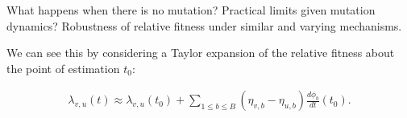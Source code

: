 \documentclass[12pt,oneside,letterpaper]{article}
\begin{document}
What happens when there is no mutation? Practical limits given mutation dynamics?
Robustness of relative fitness under similar and varying mechanisms.

We can see this by considering a Taylor expansion of the relative fitness about the point of estimation $t_{0}$:

\begin{align*}
    \lambda_{v,u}(t) \approx \lambda_{v,u}(t_{0}) + \sum_{1\leq b \leq B} (\eta_{v, b} - \eta_{u,b}) \frac{d\phi_b}{dt}(t_0).
\end{align*}










\end{document}
